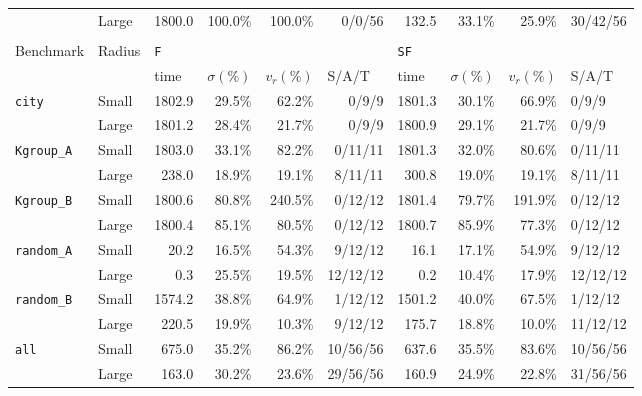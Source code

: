 \documentclass[review]{elsarticle}
\theoremstyle{definition}
\begin{document}
\begin{table}[]
\begin{tabular}{|l|l|*{4}{r}|*{4}{r}}
&Large & 1800.0 & 100.0\% & 100.0\% & 0/0/56 & 132.5 & 33.1\% & 25.9\% & \multicolumn{1}{l|}{30/42/56} \\
 \cline{1-10}
\multicolumn{10}{c}{}\\
\cline{1-10}
\multirow{2}{*}{Benchmark} & \multirow{2}{*}{Radius} & \multicolumn{4}{l|}{\texttt{F}}                                                                                 	& \multicolumn{4}{l|}{\texttt{SF}}                                                                                                    	\\ \cline{3-10}
                       	& & \multicolumn{1}{l|}{time} & \multicolumn{1}{l|}{$\sigma(\%)$} & \multicolumn{1}{l|}{$v_r(\%)$} & \multicolumn{1}{l|}{S/A/T} & \multicolumn{1}{l|}{time} & \multicolumn{1}{l|}{$\sigma(\%)$} & \multicolumn{1}{l|}{$v_r(\%)$} & \multicolumn{1}{l|}{S/A/T}  \\ \hline
\multirow{2}{*}{\texttt{city}}&Small & 1802.9 & 29.5\% & 62.2\% & 0/9/9 & 1801.3 & 30.1\% & 66.9\% & \multicolumn{1}{l|}{0/9/9} \\
&Large & 1801.2 & 28.4\% & 21.7\% & 0/9/9 & 1800.9 & 29.1\% & 21.7\% & \multicolumn{1}{l|}{0/9/9} \\  \cline{1-1}
\multirow{2}{*}{\texttt{Kgroup\_A}}&Small & 1803.0 & 33.1\% & 82.2\% & 0/11/11 & 1801.3 & 32.0\% & 80.6\% & \multicolumn{1}{l|}{0/11/11} \\
&Large & 238.0 & 18.9\% & 19.1\% & 8/11/11 & 300.8 & 19.0\% & 19.1\% & \multicolumn{1}{l|}{8/11/11} \\  \cline{1-1}
\multirow{2}{*}{\texttt{Kgroup\_B}}&Small & 1800.6 & 80.8\% & 240.5\% & 0/12/12 & 1801.4 & 79.7\% & 191.9\% & \multicolumn{1}{l|}{0/12/12} \\
&Large & 1800.4 & 85.1\% & 80.5\% & 0/12/12 & 1800.7 & 85.9\% & 77.3\% & \multicolumn{1}{l|}{0/12/12} \\  \cline{1-1}
\multirow{2}{*}{\texttt{random\_A}}&Small & 20.2 & 16.5\% & 54.3\% & 9/12/12 & 16.1 & 17.1\% & 54.9\% & \multicolumn{1}{l|}{9/12/12} \\
&Large & 0.3 & 25.5\% & 19.5\% & 12/12/12 & 0.2 & 10.4\% & 17.9\% & \multicolumn{1}{l|}{12/12/12} \\  \cline{1-1}
\multirow{2}{*}{\texttt{random\_B}}&Small & 1574.2 & 38.8\% & 64.9\% & 1/12/12 & 1501.2 & 40.0\% & 67.5\% & \multicolumn{1}{l|}{1/12/12} \\
&Large & 220.5 & 19.9\% & 10.3\% & 9/12/12 & 175.7 & 18.8\% & 10.0\% & \multicolumn{1}{l|}{11/12/12} \\  \cline{1-10}
\multirow{2}{*}{\texttt{all}}&Small & 675.0 & 35.2\% & 86.2\% & 10/56/56 & 637.6 & 35.5\% & 83.6\% & \multicolumn{1}{l|}{10/56/56} \\
&Large & 163.0 & 30.2\% & 23.6\% & 29/56/56 & 160.9 & 24.9\% & 22.8\% & \multicolumn{1}{l|}{31/56/56} \\


\end{tabular}
\end{table}
\end{document}
